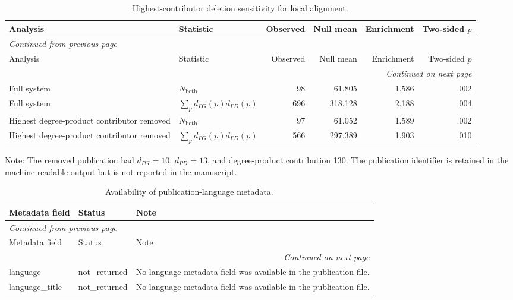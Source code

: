 \documentclass[11pt]{article}
\begin{document}
\begin{longtable}{p{4.6cm}p{3.3cm}rrrr}
\caption{Highest-contributor deletion sensitivity for local alignment.}\label{tab:s8-hub-deletion}\\
\toprule
Analysis & Statistic & Observed & Null mean & Enrichment & Two-sided $p$ \\
\midrule
\endfirsthead
\multicolumn{6}{l}{\small\itshape Continued from previous page} \\
\toprule
Analysis & Statistic & Observed & Null mean & Enrichment & Two-sided $p$ \\
\midrule
\endhead
\midrule
\multicolumn{6}{r}{\small\itshape Continued on next page} \\
\endfoot
\bottomrule
\endlastfoot
Full system & $N_{\mathrm{both}}$ & 98 & 61.805 & 1.586 & .002 \\
Full system & $\sum_p d_{PG}(p)d_{PD}(p)$ & 696 & 318.128 & 2.188 & .004 \\
Highest degree-product contributor removed & $N_{\mathrm{both}}$ & 97 & 61.052 & 1.589 & .002 \\
Highest degree-product contributor removed & $\sum_p d_{PG}(p)d_{PD}(p)$ & 566 & 297.389 & 1.903 & .010 \\
\end{longtable}

\noindent\small Note: The removed publication had $d_{PG}=10$, $d_{PD}=13$, and degree-product contribution 130. The publication identifier is retained in the machine-readable output but is not reported in the manuscript.

\begin{longtable}{p{3.5cm}p{2.7cm}p{8.0cm}}
\caption{Availability of publication-language metadata.}\label{tab:s9-language}\\
\toprule
Metadata field & Status & Note \\
\midrule
\endfirsthead
\multicolumn{3}{l}{\small\itshape Continued from previous page} \\
\toprule
Metadata field & Status & Note \\
\midrule
\endhead
\midrule
\multicolumn{3}{r}{\small\itshape Continued on next page} \\
\endfoot
\bottomrule
\endlastfoot
language & not\_returned & No language metadata field was available in the publication file. \\
language\_title & not\_returned & No language metadata field was available in the publication file. \\
\end{longtable}
\end{document}
